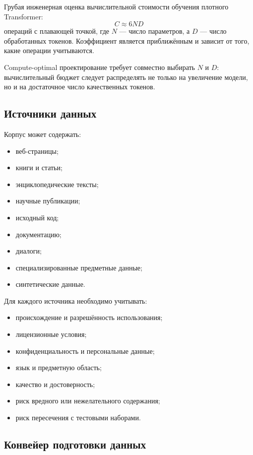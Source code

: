 \documentclass[12pt,a4paper]{article}
\newcommand{\1}{\mathbf{1}}
\theoremstyle{definition}
\theoremstyle{remark}
\begin{document}
Грубая инженерная оценка вычислительной стоимости обучения плотного
Transformer:
\[
C\approx 6ND
\]
операций с плавающей точкой, где $N$ --- число параметров, а $D$ ---
число обработанных токенов. Коэффициент является приближённым и зависит
от того, какие операции учитываются.

Compute-optimal проектирование требует совместно выбирать $N$ и $D$:
вычислительный бюджет следует распределять не только на увеличение
модели, но и на достаточное число качественных токенов.

\subsection{Источники данных}

Корпус может содержать:

\begin{itemize}
    \item веб-страницы;
    \item книги и статьи;
    \item энциклопедические тексты;
    \item научные публикации;
    \item исходный код;
    \item документацию;
    \item диалоги;
    \item специализированные предметные данные;
    \item синтетические данные.
\end{itemize}

Для каждого источника необходимо учитывать:

\begin{itemize}
    \item происхождение и разрешённость использования;
    \item лицензионные условия;
    \item конфиденциальность и персональные данные;
    \item язык и предметную область;
    \item качество и достоверность;
    \item риск вредного или нежелательного содержания;
    \item риск пересечения с тестовыми наборами.
\end{itemize}

\subsection{Конвейер подготовки данных}
\end{document}
